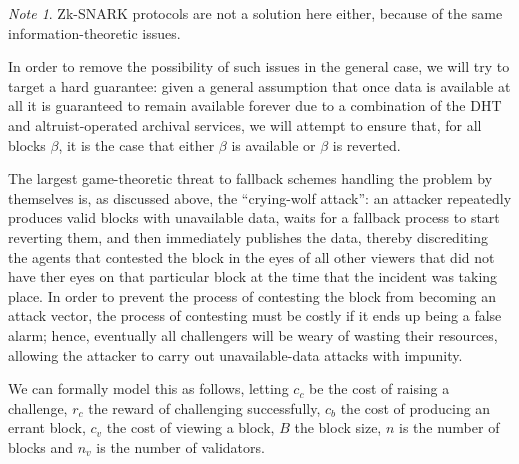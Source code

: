 \documentclass[11pt,a4paper]{report}
\theoremstyle{plain}
\theoremstyle{definition}
\theoremstyle{remark}
\newtheorem*{note}{Note}
\begin{document}
\begin{note}
Zk-SNARK protocols are not a solution here either, because of the same information-theoretic issues.
\end{note}

In order to remove the possibility of such issues in the general case, we will try to target a hard guarantee: given a general assumption that once data is available at all it is guaranteed to remain available forever due to a combination of the DHT and altruist-operated archival services, we will attempt to ensure that, for all blocks $\beta$, it is the case that either $\beta$ is available or $\beta$ is reverted.

The largest game-theoretic threat to fallback schemes handling the problem by themselves is, as discussed above, the ``crying-wolf attack'': an attacker repeatedly produces valid blocks with unavailable data, waits for a fallback process to start reverting them, and then immediately publishes the data, thereby discrediting the agents that contested the block in the eyes of all other viewers that did not have ther eyes on that particular block at the time that the incident was taking place. In order to prevent the process of contesting the block from becoming an attack vector, the process of contesting must be costly if it ends up being a false alarm; hence, eventually all challengers will be weary of wasting their resources, allowing the attacker to carry out unavailable-data attacks with impunity.

We can formally model this as follows, letting $c_c$ be the cost of raising a challenge, $r_c$ the reward of challenging successfully, $c_b$ the cost of producing an errant block, $c_v$ the cost of viewing a block, $B$ the block size, $n$ is the number of blocks and $n_v$ is the number of validators. 
\end{document}
